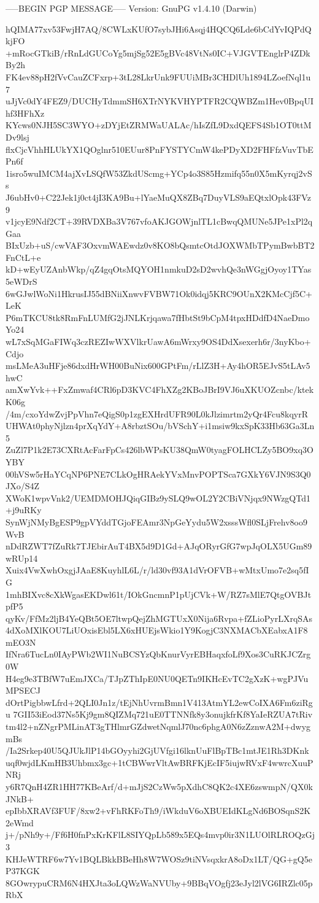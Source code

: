 -----BEGIN PGP MESSAGE-----
Version: GnuPG v1.4.10 (Darwin)

hQIMA77xv53FwjH7AQ/8CWLxKUfO7sybJHi6Asqj4HQCQ6Lde6bCdYvIQPdQkjFO
+mRocGTkiB/rRnLdGUCoYg5mjSg52E5gBVc48VtNs0IC+VJGVTEnglrP4ZDkBy2h
FK4ev88pH2fVvCauZCFxrp+3tL28LkrUnk9FUUiMBr3CHDlUh1894LZoefNql1u7
uJjVc0dY4FEZ9/DUCHyTdmmSH6XTrNYKVHYPTFR2CQWBZm1Hev0BpqUIhf3HFhXz
KYcws0NJH5SC3WYO+zDYjEtZRMWaUALAc/hIsZfL9DxdQEFS4Sb1OT0ttMDv9lsj
flxCjcVhhHLUkYX1QOglnr510EUur8PnFYSTYCmW4kePDyXD2FHFfzVuvTbEPn6f
1isro5wuIMCM4ajXvLSQfW53ZkdUScmg+YCp4o3S85Hzmifq55n0X5mKyrqj2vSs
J6ubHv0+C22Jek1j0ct4jI3KA9Bu+lYaeMuQX8ZBq7DuyVLS9aEQtxlOpk43FVz9
v1jcyE9Ndf2CT+39RVDXBa3V767vfoAKJGOWjnlTL1cBwqQMUNe5JPe1xPl2qGaa
BIxUzb+uS/cwVAF3OxvmWAEwdz0v8KO8bQsmtcOtdJOXWMbTPymBwbBT2FnCtL+e
kD+wEyUZAnbWkp/qZ4gqOtsMQYOH1nmkuD2sD2wvhQe3nWGgjOyoy1TYas5eWDrS
6wGJwlWoNi1HkrusIJ55dBNiiXnwvFVBW71Ok0idqj5KRC9OUnX2KMcCjf5C+LeK
P6mTKCU8tk8RmFnLUMfG2jJNLKrjqawa7fHbtSt9bCpM4tpxHDdfD4NaeDmoYo24
wL7xSqMGaFIWq3czREZIwWXVlkrUawA6mWrxy9OS4DdXsexerh6r/3nyKbo+Cdjo
msLMeA3uHFje86dxdHrWH00BuNix600GPtFm/rLlZ3H+Ay4hOR5EJvS5tLAv5hwC
amXwYvk++FxZmwaf4CRl6pD3KVC4FhXZg2KBoJBrI9VJ6uXKUOZcnbc/ktekK06g
/4m/cxoYdwZvjPpVhn7eQigS0p1zgEXHrdUFR90L0kJlzimrtm2yQr4Fcu8kqyrR
UHWAt0phyNjlzn4prXqYdY+A8rbztSOu/bVSchY+i1msiw9kxSpK33Hb63Ga3Ln5
ZuZl7P1k2E73CXRtAcFarFpCs426lbWPsKU38QmW0tyagFOLHCLZy5BO9xq3OYBY
00hVSw5rHaYCqNP6PNE7CLkOgHRAekYVxMnvPOPTSca7GXkY6VJN9S3Q0JXo/S4Z
XWoK1wpvVnk2/UEMDMOHJQiqGIBz9ySLQ9wOL2Y2CBiVNjqx9NWzgQTd1+j9uRKy
SynWjNMyBgESP9gpVYddTGjoFEAmr3NpGeYydu5W2xsssWfl0SLjFrehv8oo9WvB
nDdRZWT7fZuRk7TJEbirAuT4BX5d9D1Gd+AJqORyrGfG7wpJqOLX5UGm89wRUp14
Xuix4VwXwhOxgjJAaE8KuyhlL6L/r/ld30vf93A1dVrOFVB+wMtxUmo7e2sq5fIG
1mhBIXvc8cXkWgasEKDwl61t/IOkGncmnP1pUjCVk+W/RZ7sMlE7QtgOVBJtpfP5
qyKv/FfMz2ljB4YeQBt5OE7ltwpQejZhMGTUxX0Nija6Rvpa+fZLioPyrLXrqSAs
4dXoMXlKOU7LiUOxisEbl5LX6xHUEjsWkio1Y9KogjC3NXMACbXEabxA1F8mEO3N
IfNra6TucLn0IAyPWb2WI1NuBCSYzQbKnurVyrEBHaqxfoLf9Xos3CuRKJCZrg0W
H4eg9e3TBfW7uEmJXCa/TJpZThIpE0NU0QETn9IKHcEvTC2gXzK+wgPJVuMPSECJ
dOrtPigbbwLfrd+2QLI0Jn1z/tEjNhUvrmBmn1V413AtmYL2ewCoIXA6Fm6ziRgu
7GII53iEod37Ns5Kj9gm8QIZMq721uE0TTNNfk8y3onujkfrKf8YaIeRZUA7tRiv
tm4l2+nZNgrPMLinAT3gTHlmrGZdwetNqmlJ70nc6phgA0N6zZznwA2M+dwygmBs
/Ia2Srkep40U5QJUkJlP14bGOyyhi2GjUVfgi16lknUuFlBpTBc1mtJE1Rh3DKnk
uqf0wjdLKmHB3Uhbmx3gc+1tCBWwrVltAwBRFKjEcIF5iujwRVxF4wwrcXuuPNRj
y6R7QnH4ZR1HH77KBeArf/d+mJjS2CzWw5pXdhC8QK2c4XE6zswmpN/QX0kJNkB+
epIbbXRAVf3FUF/8xw2+vFhRKFoTh9/iWkduV6oXBUEIdKLgNd6BOSqnS2K2eWmd
j+/pNh9y+/Ff6H0fnPxKrKFlL8SIYQpLb589x5EQs4mvp0ir3N1LUOlRLROQzGj3
KHJeWTRF6w7Yv1BQLBkkBBeHh8W7WOSz9tiNVsqxkrA8oDx1LT/QG+gQ5eP37KGK
8GOwrypuCRM6N4HXJta3oLQWzWaNVUby+9BBqVOgfj23eJyl2lVG6IRZlc05pRbX
